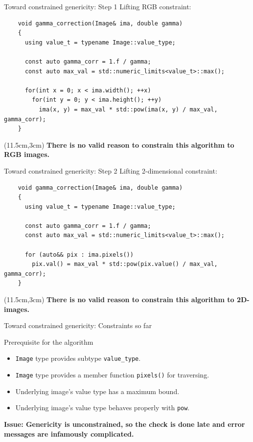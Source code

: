 \documentclass[12pt,aspectratio=169]{beamer}
\begin{document}
\begin{frame}[fragile]{Toward constrained genericity: Step 1}
  Lifting RGB constraint:
  \begin{verbatim}
    void gamma_correction(Image& ima, double gamma)
    {
      using value_t = typename Image::value_type;

      const auto gamma_corr = 1.f / gamma;
      const auto max_val = std::numeric_limits<value_t>::max();
    
      for(int x = 0; x < ima.width(); ++x)
        for(int y = 0; y < ima.height(); ++y)
          ima(x, y) = max_val * std::pow(ima(x, y) / max_val, gamma_corr);
    }
  \end{verbatim}
  \begin{textblock*}{4cm}(11.5cm,3cm)
    \textbf{There is no valid reason to constrain this algorithm to RGB images.}
  \end{textblock*}
\end{frame}

\begin{frame}[fragile]{Toward constrained genericity: Step 2}
  Lifting 2-dimensional constraint:
  \begin{verbatim}
    void gamma_correction(Image& ima, double gamma)
    {
      using value_t = typename Image::value_type;

      const auto gamma_corr = 1.f / gamma;
      const auto max_val = std::numeric_limits<value_t>::max();
    
      for (auto&& pix : ima.pixels())
        pix.val() = max_val * std::pow(pix.value() / max_val, gamma_corr);
    }
  \end{verbatim}
  \begin{textblock*}{4cm}(11.5cm,3cm)
    \textbf{There is no valid reason to constrain this algorithm to 2D-images.}
  \end{textblock*}
\end{frame}

\begin{frame}[fragile]{Toward constrained genericity: Constraints so far}
  \begin{alertblock}{Prerequisite for the algorithm}
    \begin{itemize}
      \item \texttt{Image} type provides subtype \texttt{value\_type}.
      \item \texttt{Image} type provides a member function \texttt{pixels()} for traversing.
      \item Underlying image's value type has a maximum bound.
      \item Underlying image's value type behaves properly with \texttt{pow}.
    \end{itemize}
  \end{alertblock}
  \textbf{Issue: Genericity is unconstrained, so the check is done late and error messages are infamously complicated.}
\end{frame}
\end{document}
